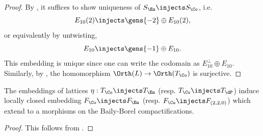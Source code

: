 \documentclass[../main.tex]{subfiles}
\begin{document}
\begin{proof}
By \cite[Lem. 2.4]{AEGS23}, it suffices to show uniqueness of $S_{\En} \injects S_{\Co}$, i.e.
\[
E_{10}(2) \injects \gens{-2}\oplus E_{10}(2)
,\]
or equivalently by untwisting,
\[
E_{10} \injects \gens{-1}\oplus E_{10}
.\]
This embedding is unique since one can write the codomain as $E_{10}^\perp \oplus E_{10}$. Similarly, by \cite[Cor. 1.5.2,\, Thm. 3.6.3]{Nik79}, the homomorphism $\Orth(L)\to \Orth(T_\Co)$ is surjective.
\end{proof}

\begin{lemma}\label{lem:locally_closed_embedding_BB}
The embeddings of lattices $\eta: T_\Co\injects T_\En$ (resp. $T_{\Co} \injects T_{\dP}$) induce locally closed embedding $F_\Co \injects F_\En$ (resp. $F_{\Co} \injects F_{(2,2,0)}$) which extend to a morphisms on the Baily-Borel compactifications.
\end{lemma}
\begin{proof}
This follows from \cite[\S 5, Thm.2]{KK72}.
\end{proof}
\end{document}
